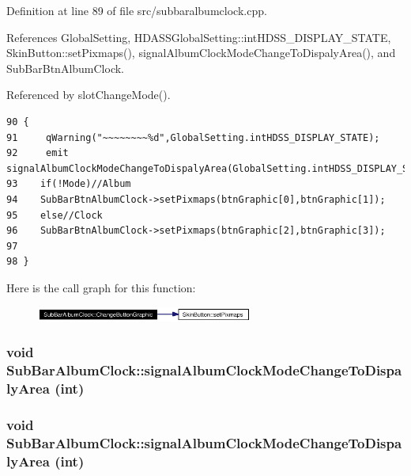 Definition at line 89 of file src/subbaralbumclock.cpp.

References Global\-Setting, HDASSGlobal\-Setting::int\-HDSS\_\-DISPLAY\_\-STATE, Skin\-Button::set\-Pixmaps(), signal\-Album\-Clock\-Mode\-Change\-To\-Dispaly\-Area(), and Sub\-Bar\-Btn\-Album\-Clock.

Referenced by slot\-Change\-Mode().



\footnotesize\begin{verbatim}90 {
91     qWarning("~~~~~~~~%d",GlobalSetting.intHDSS_DISPLAY_STATE);
92     emit signalAlbumClockModeChangeToDispalyArea(GlobalSetting.intHDSS_DISPLAY_STATE);
93    if(!Mode)//Album
94    SubBarBtnAlbumClock->setPixmaps(btnGraphic[0],btnGraphic[1]);
95    else//Clock
96    SubBarBtnAlbumClock->setPixmaps(btnGraphic[2],btnGraphic[3]);
97  
98 }
\end{verbatim}\normalsize 


Here is the call graph for this function:\begin{figure}[H]
\begin{center}
\leavevmode
\includegraphics[width=202pt]{classSubBarAlbumClock_SubBarAlbumClockd0_cgraph}
\end{center}
\end{figure}
\subsubsection{\setlength{\rightskip}{0pt plus 5cm}void Sub\-Bar\-Album\-Clock::signal\-Album\-Clock\-Mode\-Change\-To\-Dispaly\-Area (int)\hspace{0.3cm}{\tt  [signal]}}\label{classSubBarAlbumClock_SubBarAlbumClockl1}


\subsubsection{\setlength{\rightskip}{0pt plus 5cm}void Sub\-Bar\-Album\-Clock::signal\-Album\-Clock\-Mode\-Change\-To\-Dispaly\-Area (int)\hspace{0.3cm}{\tt  [signal]}}\label{classSubBarAlbumClock_SubBarAlbumClockl0}




